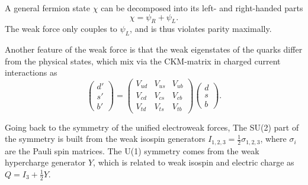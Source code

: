 A general fermion state $\chi$ can be decomposed into its left- and right-handed parts
\begin{equation}\label{eqn:leftright}
\chi=\psi_R+\psi_L.
\end{equation}
The weak force only couples to $\psi_L$, and is thus violates parity maximally.

Another feature of the weak force is that the weak eigenstates of the quarks
differ from the physical states, which mix via the \ac{CKM}-matrix \cite{ckm-matrix-cabibbo,ckm-matrix-KM}
in charged current interactions as
\begin{equation}\label{eqn:ckm_matrix}
\begin{pmatrix} d' \\
s' \\
b'  \end{pmatrix} = \begin{pmatrix} V_{ud} & V_{us} & V_{ub} \\
V_{cd} & V_{cs} & V_{cb} \\
V_{td} & V_{ts} & V_{tb} \end{pmatrix} \begin{pmatrix} d \\
s\\
b \end{pmatrix}.
\end{equation}

Going back to the symmetry of the unified electroweak forces,
The SU(2) part of the symmetry is built from the weak
isospin generators $I_{1,2,3} = \frac{1}{2}\sigma_{1,2,3}$,
where $\sigma_i$ are the Pauli spin matrices. The U(1)
symmetry comes from the weak hypercharge generator $Y$, which
is related to weak isospin and electric charge as $Q = I_3 + \frac{1}{2}Y$.

